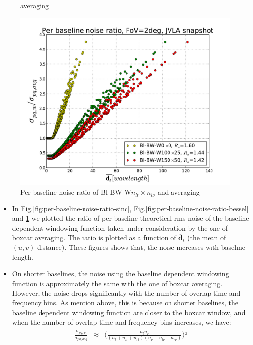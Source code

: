 \documentclass[useAMS,usenatbib]{mn2e}
\begin{document}
\begin{figure}
\begin{minipage}{0.38\linewidth}
{averaging}\label{fig:per-baseline-noise-ratio-bessel}\end{minipage}
  \begin{minipage}{0.38\linewidth}\includegraphics[width=1\textwidth]{./Figures/per-baseline-noise-ratio-BW.pdf}
  \caption{Per baseline noise ratio of Bl-BW-W$n_{lt}\times n_{l\nu}$ and averaging}\label{fig:per-baseline-noise-ratio-BW}
  \end{minipage}
\end{figure}
\begin{itemize}
 \item In Fig.\ref{fig:per-baseline-noise-ratio-sinc}, Fig.\ref{fig:per-baseline-noise-ratio-bessel} 
and \ref{fig:per-baseline-noise-ratio-BW} we plotted the ratio of per baseline theoretical rms noise of the baseline dependent 
windowing function taken under consideration by the one of boxcar averaging. The ratio is plotted as a function of 
$\overline{\mathbf{d}}_t$ (the mean of  $(u,v)$ distance). These figures shows that, the noise increases with baseline length.
   \item On shorter baselines, the noise using the baseline dependent windowing function is approximately the same with the one of boxcar
averaging. However, the noise drops significantly with the number of  overlap time and frequency bins. As mention above, this is because on 
shorter  baselines, the baseline dependent windowing function are closer to the boxcar window, and when the number of overlap time  and 
frequency  bins increases, we have:
\begin{eqnarray*}
 \frac{\sigma_{pq, w}}{\sigma_{pq,avg}} &\approx& \Bigg(\frac{n_t n_{\nu}}{(n_t + n_{lt} + n_{rt})(n_{\nu} + n_{l\nu} + 
n_{r\nu})}\Bigg)^{\frac{1}{2}}
\end{eqnarray*}
\end{itemize}
\end{document}
